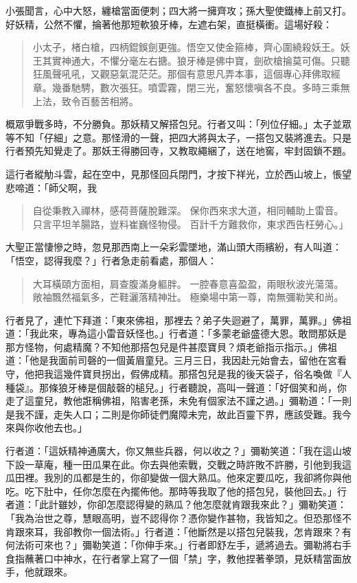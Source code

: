 小張聞言，心中大怒，纏槍當面便刺；四大將一擁齊攻；孫大聖使鐵棒上前又打。好妖精，公然不懼，掄著他那短軟狼牙棒，左遮右架，直挺橫衝。這場好殺：
\begin{quote}
小太子，楮白槍，四柄錕鋘劍更強。悟空又使金箍棒，齊心圍繞殺妖王。妖王其實神通大，不懼分毫左右搪。狼牙棒是佛中寶，劍砍槍掄莫可傷。只聽狂風聲吼吼，又觀惡氣混茫茫。那個有意思凡弄本事，這個專心拜佛取經章。幾番馳騁，數次張狂。噴雲霧，閉三光，奮怒懷嗔各不良。多時三乘無上法，致令百藝苦相將。
\end{quote}

概眾爭戰多時，不分勝負。那妖精又解搭包兒。行者又叫：「列位仔細。」太子並眾等不知「仔細」之意。那怪滑的一聲，把四大將與太子，一搭包又裝將進去。只是行者預先知覺走了。那妖王得勝回寺，又教取繩綑了，送在地窖，牢封固鎖不題。

這行者縱觔斗雲，起在空中，見那怪回兵閉門，才按下祥光，立於西山坡上，悵望悲啼道：「師父啊，我
\begin{quote}
自從秉教入禪林，感荷菩薩脫難深。
保你西來求大道，相同輔助上雷音。
只言平坦羊腸路，豈料崔巍怪物侵。
百計千方難救你，東求西告枉勞心。」
\end{quote}

大聖正當悽慘之時，忽見那西南上一朵彩雲墜地，滿山頭大雨繽紛，有人叫道：「悟空，認得我麼？」行者急走前看處，那個人：
\begin{quote}
大耳橫頤方面相，肩查腹滿身軀胖。
一腔春意喜盈盈，兩眼秋波光蕩蕩。
敞袖飄然福氣多，芒鞋灑落精神壯。
極樂場中第一尊，南無彌勒笑和尚。
\end{quote}

行者見了，連忙下拜道：「東來佛祖，那裡去？弟子失迴避了，萬罪，萬罪。」佛祖道：「我此來，專為這小雷音妖怪也。」行者道：「多蒙老爺盛德大恩。敢問那妖是那方怪物，何處精魔？不知他那搭包兒是件甚麼寶貝？煩老爺指示指示。」佛祖道：「他是我面前司磬的一個黃眉童兒。三月三日，我因赴元始會去，留他在宮看守，他把我這幾件寶貝拐出，假佛成精。那搭包兒是我的後天袋子，俗名喚做『人種袋』。那條狼牙棒是個敲磬的槌兒。」行者聽說，高叫一聲道：「好個笑和尚，你走了這童兒，教他誑稱佛祖，陷害老孫，未免有個家法不謹之過。」彌勒道：「一則是我不謹，走失人口；二則是你師徒們魔障未完，故此百靈下界，應該受難。我今來與你收他去也。」

行者道：「這妖精神通廣大，你又無些兵器，何以收之？」彌勒笑道：「我在這山坡下設一草庵，種一田瓜果在此。你去與他索戰，交戰之時許敗不許勝，引他到我這瓜田裡。我別的瓜都是生的，你卻變做一個大熟瓜。他來定要瓜吃，我卻將你與他吃。吃下肚中，任你怎麼在內擺佈他。那時等我取了他的搭包兒，裝他回去。」行者道：「此計雖妙，你卻怎麼認得變的熟瓜？他怎麼就肯跟我來此？」彌勒笑道：「我為治世之尊，慧眼高明，豈不認得你？憑你變作甚物，我皆知之。但恐那怪不肯跟來耳，我卻教你一個法術。」行者道：「他斷然是以搭包兒裝我，怎肯跟來？有何法術可來也？」彌勒笑道：「你伸手來。」行者即舒左手，遞將過去。彌勒將右手食指蘸著口中神水，在行者掌上寫了一個「禁」字，教他捏著拳頭，見妖精當面放手，他就跟來。

